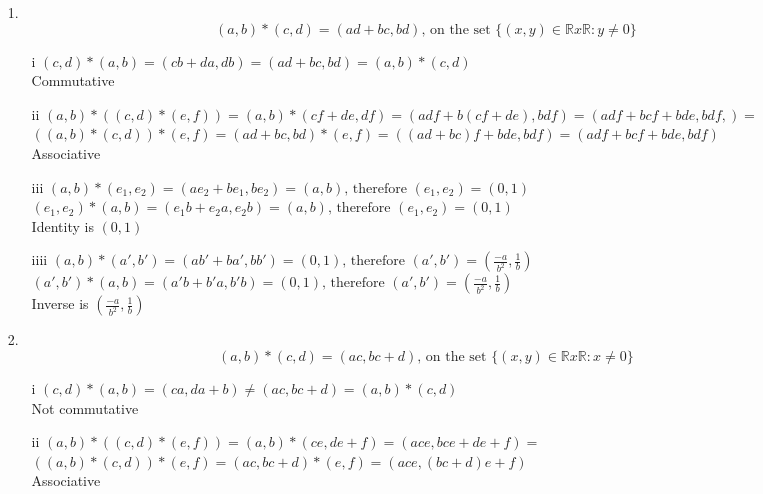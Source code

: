 \begin{enumerate}

\item[1.]
\begin{equation}
(a,b)*(c,d)=(ad+bc,bd) \text{, on the set } \{(x,y) \in \mathbb{R} x \mathbb{R}: y \neq 0\}
\end{equation}

\begin{enumerate}

\item[i]
$(c,d)*(a,b)=(cb+da,db)=(ad+bc,bd)=(a,b)*(c,d)$ \\
Commutative

\item[ii]
$(a,b)*((c,d)*(e,f))=(a,b)*(cf+de,df)=(adf+b(cf+de),bdf)=(adf+bcf+bde, bdf,) = $ \\
$((a,b)*(c,d))*(e,f)=(ad+bc,bd)*(e,f)=((ad+bc)f+bde,bdf)=(adf+bcf+bde, bdf)$ \\
Associative

\item[iii]
$(a,b)*(e_{1},e_{2})=(ae_{2}+be_{1},be_{2})=(a,b) \text{, therefore } (e_{1},e_{2})=(0,1)$ \\
$(e_{1},e_{2})*(a,b)=(e_{1}b+e_{2}a,e_{2}b)=(a,b) \text{, therefore } (e_{1},e_{2})=(0,1)$ \\
Identity is $(0,1)$

\item[iiii]
$(a,b)*(a',b')=(ab'+ba',bb')=(0,1) \text{, therefore } (a',b')=(\frac{-a}{b^2},\frac{1}{b})$ \\
$(a',b')*(a,b)=(a'b+b'a,b'b)=(0,1) \text{, therefore } (a',b')=(\frac{-a}{b^2},\frac{1}{b})$ \\
Inverse is $(\frac{-a}{b^2},\frac{1}{b})$

\end{enumerate}

\item[2.]
\begin{equation}
(a,b)*(c,d)=(ac,bc+d) \text{, on the set } \{(x,y) \in \mathbb{R} x \mathbb{R}: x \neq 0\}
\end{equation}

\begin{enumerate}

\item[i]
$(c,d)*(a,b)=(ca,da+b) \neq (ac,bc+d)=(a,b)*(c,d)$ \\
Not commutative

\item[ii]
$(a,b)*((c,d)*(e,f))=(a,b)*(ce,de+f)=(ace,bce+de+f)= $ \\
$((a,b)*(c,d))*(e,f)=(ac,bc+d)*(e,f)=(ace,(bc+d)e+f) $ \\
Associative


\end{enumerate}
\end{enumerate}
